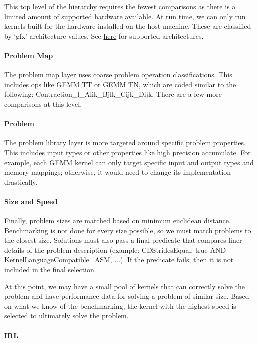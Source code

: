 \documentclass[]{article}
\begin{document}
This top level of the hierarchy requires the fewest comparisons as there is a limited amount of supported hardware available. At run time, we can only run kernels built for the hardware installed on the host machine. These are classified by `gfx' architecture values. See \href{https://github.com/ROCmSoftwarePlatform/Tensile/wiki/Languages}{here} for supported architectures.

\paragraph{Problem Map}
The problem map layer uses coarse problem operation classifications. This includes ops like GEMM TT or GEMM TN, which are coded similar to the following: Contraction\_l\_Alik\_Bjlk\_Cijk\_Dijk. There are a few more comparisons at this level.

\paragraph{Problem}

The problem library layer is more targeted around specific problem properties. This includes input types or other properties like high precision accumulate. For example, each GEMM kernel can only target specific input and output types and memory mappings; otherwise, it would need to change its implementation drastically.

\paragraph{Size and Speed}

Finally, problem sizes are matched based on minimum euclidean distance. Benchmarking is not done for every size possible, so we must match problems to the closest size. Solutions must also pass a final predicate that compares finer details of the problem description (example: CDStridesEqual: true AND KernelLanguageCompatible=ASM, ...). If the predicate fails, then it is not included in the final selection.

At this point, we may have a small pool of kernels that can correctly solve the problem and have performance data for solving a problem of similar size. Based on what we know of the benchmarking, the kernel with the highest speed is selected to ultimately solve the problem.

\paragraph{IRL}
\end{document}
